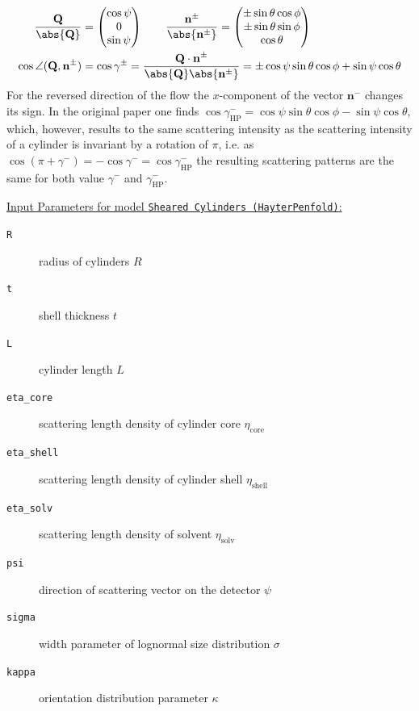 \begin{align}
\frac{\mathbf{Q}}{\abs{\mathbf{Q}}} &=
\begin{pmatrix}
\cos \psi \\
0  \\
\sin \psi
\end{pmatrix} \qquad
\frac{\mathbf{n}^\pm}{\abs{\mathbf{n}^\pm}} =
\begin{pmatrix}
\pm \sin \theta \cos \phi \\
\pm \sin \theta \sin \phi  \\
\cos \theta
\end{pmatrix} \\
\cos \angle(\mathbf{Q,n}^\pm) &= \cos \gamma^\pm = \frac{\mathbf{Q\cdot n}^\pm}{\abs{\mathbf{Q}}\abs{\mathbf{n}^\pm}} =  \pm \cos\psi \sin\theta \cos\phi + \sin\psi \cos\theta
\end{align}
For the reversed direction of the flow the $x$-component of the vector $\mathbf{n}^-$ changes its sign. In the original paper \cite{Hayter1984} one finds $\cos \gamma^-_\mathrm{HP} = \cos\psi \sin\theta \cos\phi - \sin\psi \cos\theta$, which, however, results to the same scattering intensity as the scattering intensity of a cylinder is invariant by a rotation of $\pi$, i.e. as $\cos(\pi+\gamma^-) =-\cos\gamma^- = \cos\gamma^-_\mathrm{HP}$ the resulting scattering patterns are the same for both value $\gamma^-$ and $\gamma^-_\mathrm{HP}$.

\vspace{5mm}

\uline{Input Parameters for model \texttt{Sheared Cylinders (HayterPenfold)}:}\\
\begin{description}
\item[\texttt{R}] radius of cylinders $R$
\item[\texttt{t}] shell thickness $t$
\item[\texttt{L}] cylinder length $L$
\item[\texttt{eta\_core}] scattering length density of cylinder core $\eta_\mathrm{core}$
\item[\texttt{eta\_shell}] scattering length density of cylinder shell $\eta_\mathrm{shell}$
\item[\texttt{eta\_solv}] scattering length density of solvent $\eta_\mathrm{solv}$
\item[\texttt{psi}] direction of scattering vector on the detector $\psi$
\item[{\texttt{sigma}}] width parameter of lognormal size distribution $\sigma$
\item[{\texttt{kappa}}] orientation distribution parameter $\kappa$
\end{description}

